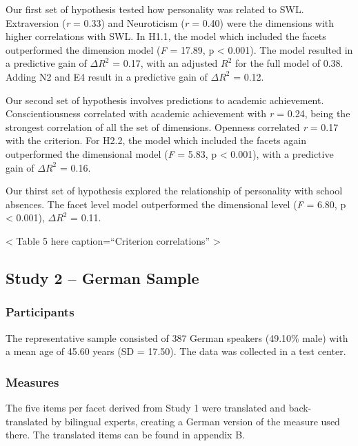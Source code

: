 \documentclass[,man,floatsintext]{apa6}
\begin{document}
Our first set of hypothesis tested how personality was related to SWL.
Extraversion (\emph{r} = 0.33) and Neuroticism (\emph{r} = 0.40) were
the dimensions with higher correlations with SWL. In H1.1, the model
which included the facets outperformed the dimension model (\emph{F} =
17.89, p \textless{} 0.001). The model resulted in a predictive gain of
\(\Delta R^2\) = 0.17, with an adjusted \(R^2\) for the full model of
0.38. Adding N2 and E4 result in a predictive gain of \(\Delta R^2\) =
0.12.

Our second set of hypothesis involves predictions to academic
achievement. Conscientiousness correlated with academic achievement with
\emph{r} = 0.24, being the strongest correlation of all the set of
dimensions. Openness correlated \emph{r} = 0.17 with the criterion. For
H2.2, the model which included the facets again outperformed the
dimensional model (\emph{F} = 5.83, p \textless{} 0.001), with a
predictive gain of \(\Delta R^2\) = 0.16.

Our thirst set of hypothesis explored the relationship of personality
with school absences. The facet level model outperformed the dimensional
level (\emph{F} = 6.80, p \textless{} 0.001), \(\Delta R^2\) = 0.11.

\vspace{5mm}

\textless{} Table 5 here caption=\enquote{Criterion correlations}
\textgreater{}

\vspace{5mm}

\subsection{Study 2 -- German Sample}\label{study-2-german-sample}

\subsubsection{Participants}\label{participants-1}

The representative sample consisted of 387 German speakers (49.10\%
male) with a mean age of 45.60 years (SD = 17.50). The data was
collected in a test center.

\subsubsection{Measures}\label{measures-1}

The five items per facet derived from Study 1 were translated and
back-translated by bilingual experts, creating a German version of the
measure used there. The translated items can be found in appendix B.
\end{document}
